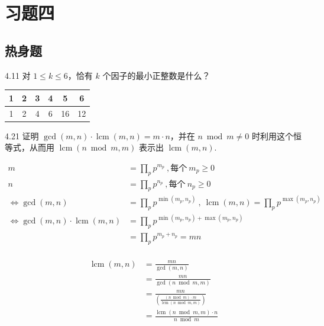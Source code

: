 \section{习题四}

\subsection{热身题}

\begin{problem}{4.1}{1}
  对 \( 1 \le k \le 6 \)，恰有 \( k \) 个因子的最小正整数是什么？
\end{problem}

\begin{table}[ht]
  \centering
  {\color{grayblack}
    \begin{tabular}{c|c|c|c|c|c}
      \toprule
      1 & 2 & 3 & 4 & 5 & 6 \\
      \midrule
      1 & 2 & 4 & 6 & 16 & 12 \\
      \bottomrule
  \end{tabular}}
\end{table}

\begin{problem}{4.2}{1}
  证明 \( \gcd(m,n) \cdot \operatorname{lcm}(m,n) = m \cdot n \)，并在 \( n \bmod m \neq 0 \) 时利用这个恒等式，从而用 \( \operatorname{lcm}(n \bmod m, m) \) 表示出 \( \operatorname{lcm}(m,n) \).
\end{problem}

\begin{align*}
  m &= \prod_{p} p^{m_p} \ , \text{每个} \ m_p \ge 0 \\
  n &= \prod_{p} p^{n_p} \ , \text{每个} \ n_p \ge 0 \\
  \Leftrightarrow \gcd (m,n) &= \prod_{p} p^{\min{(m_p,n_p)}} \ , \ \operatorname{lcm} (m,n) = \prod_{p} p^{\max{(m_p,n_p)}} \\
  \Leftrightarrow \gcd(m,n) \cdot \operatorname{lcm}(m,n) &= \prod_{p} p^{\min{(m_p,n_p)} + \max{(m_p,n_p)}} \\
  &= \prod_{p} p^{m_p + n_p} = mn \\
\end{align*}

\begin{align*}
  \operatorname{lcm}(m,n) &= \frac{mn}{\gcd(m,n)} \\
  &= \frac{mn}{\gcd(n \bmod m , m)} \\
  &= \frac{mn}{(\frac{(n \bmod m) \cdot m}{\operatorname{lcm}(n \bmod m , m)})} \\
  &= \frac{\operatorname{lcm}(n \bmod m , m) \cdot n}{n \bmod m}
\end{align*}

